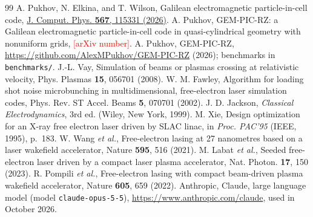 \documentclass[aps,prab,reprint,floatfix,superscriptaddress,amsmath,amssymb]{revtex4-2}
\newcommand{\todo}[1]{\textcolor{red}{[#1]}}
\begin{document}
\begin{thebibliography}{99}
 A. Pukhov, N. Elkina, and T. Wilson, Galilean electromagnetic particle-in-cell code, \href{https://doi.org/10.1016/j.jcp.2026.115331}{J. Comput. Phys. \textbf{567}, 115331 (2026)}.
 A. Pukhov, GEM-PIC-RZ: a Galilean electromagnetic particle-in-cell code in quasi-cylindrical geometry with nonuniform grids, \todo{arXiv number}.
 A. Pukhov, GEM-PIC-RZ, \url{https://github.com/AlexMPukhov/GEM-PIC-RZ} (2026); benchmarks in \texttt{benchmarks/}.
 J.-L. Vay, Simulation of beams or plasmas crossing at relativistic velocity, Phys. Plasmas \textbf{15}, 056701 (2008).
 W. M. Fawley, Algorithm for loading shot noise microbunching in multidimensional, free-electron laser simulation codes, Phys. Rev. ST Accel. Beams \textbf{5}, 070701 (2002).
 J. D. Jackson, \textit{Classical Electrodynamics}, 3rd ed. (Wiley, New York, 1999).
 M. Xie, Design optimization for an X-ray free electron laser driven by SLAC linac, in \textit{Proc. PAC'95} (IEEE, 1995), p.~183.
 W. Wang \textit{et al.}, Free-electron lasing at 27 nanometres based on a laser wakefield accelerator, Nature \textbf{595}, 516 (2021).
 M. Labat \textit{et al.}, Seeded free-electron laser driven by a compact laser plasma accelerator, Nat. Photon. \textbf{17}, 150 (2023).
 R. Pompili \textit{et al.}, Free-electron lasing with compact beam-driven plasma wakefield accelerator, Nature \textbf{605}, 659 (2022).
 Anthropic, Claude, large language model (model \texttt{claude-opus-5-5}), \url{https://www.anthropic.com/claude}, used in October 2026.
\end{thebibliography}
\end{document}
